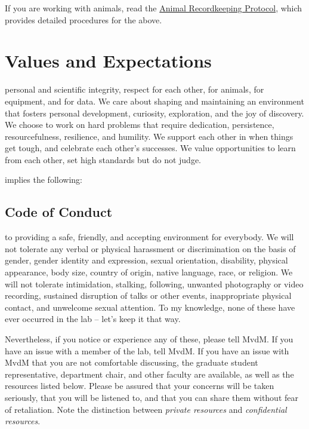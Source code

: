 \documentclass{tufte-book}
\begin{document}
If you are working with animals, read the \href{github link}{Animal
  Recordkeeping Protocol}, which provides detailed procedures for the
above.


\chapter{Values and Expectations}\label{ch:expectations}

 personal and scientific integrity, respect
for each other, for animals, for equipment, and for data. We care
about shaping and maintaining an environment that fosters personal
development, curiosity, exploration, and the joy of discovery. We
choose to work on hard problems that require dedication, persistence,
resourcefulness, resilience, and humility. We support each other in
when things get tough, and celebrate each other's successes. We value
opportunities to learn from each other, set high standards but do not
judge.

 implies the following:

\section{Code of Conduct}

 to providing a safe, friendly, and
accepting environment for everybody. We will not tolerate any verbal
or physical harassment or discrimination on the basis of gender,
gender identity and expression, sexual orientation, disability,
physical appearance, body size, country of origin, native language,
race, or religion. We will not tolerate intimidation, stalking,
following, unwanted photography or video recording, sustained
disruption of talks or other events, inappropriate physical contact,
and unwelcome sexual attention. To my knowledge, none of these have
ever occurred in the lab -- let's keep it that way.

Nevertheless, if you notice or experience any of these, please tell
MvdM. If you have an issue with a member of the lab, tell MvdM. If you
have an issue with MvdM that you are not comfortable discussing, the
graduate student representative, department chair, and other faculty
are available, as well as the resources listed below. Please be
assured that your concerns will be taken seriously, that you will be
listened to, and that you can share them without fear of
retaliation. Note the distinction between {\it private resources} and
{\it confidential resources}.
\end{document}
